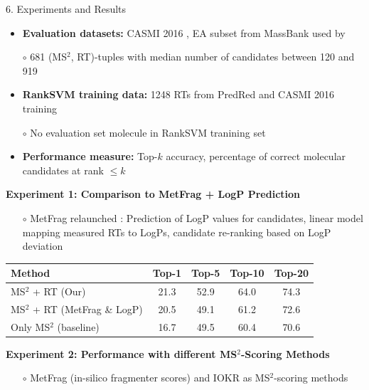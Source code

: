 \documentclass{beamer}
\newcommand{\ms}{MS}
\newcommand{\msms}{\ms$^2$}
\begin{document}
\begin{frame}{}
\begin{columns}[T]
    \begin{block}{{\normalsize 6. Experiments and Results}}
    \begin{itemize}
        \item \textbf{Evaluation datasets:} CASMI 2016 \cite{Schymanski2017}, EA subset from MassBank used by \cite{Ruttkies2016} 
        \item[$\circ$] 681 (\msms, RT)-tuples with median number of candidates between 120 and 919
        \item \textbf{RankSVM training data:} 1248 RTs from PredRed \cite{Stanstrup2015} and CASMI 2016 training
        \item[$\circ$] No evaluation set molecule in RankSVM tranining set
        \item \textbf{Performance measure:} Top-$k$ accuracy, percentage of correct molecular candidates at rank $\leq k$
    \end{itemize}
    \vspace{0.5cm}
    \textbf{Experiment 1: Comparison to MetFrag + LogP Prediction}
    \begin{itemize}
        \item[$\circ$] MetFrag relaunched \cite{Ruttkies2016}: Prediction of LogP values for candidates, linear model mapping measured RTs to LogPs, candidate re-ranking based on LogP deviation
    \end{itemize}
        \begin{table}
            \centering
            \begin{tabular}{lcccc}
                \toprule
                \textbf{Method} & \textbf{Top-1} & \textbf{Top-5} & \textbf{Top-10} & \textbf{Top-20} \\ \midrule
                \msms{} + RT (Our) & 21.3 & 52.9 & 64.0 & 74.3 \\
                \msms{} + RT (MetFrag \& LogP) & 20.5 & 49.1 & 61.2 & 72.6 \\ \cmidrule(lr){1-5}
                Only \msms{} (baseline) & 16.7 & 49.5 & 60.4 & 70.6 \\
                \bottomrule
            \end{tabular}
        \end{table}
    \vspace{1cm}
    \textbf{Experiment 2: Performance with different \msms{}-Scoring Methods}
    \begin{itemize}
        \item[$\circ$] MetFrag (in-silico fragmenter scores) and IOKR \cite{Brouard_ismb_2016} as \msms{}-scoring methods

\end{itemize}
\end{block}
\end{columns}
\end{frame}
\end{document}
